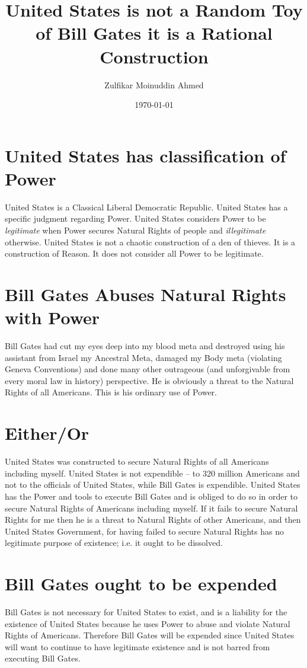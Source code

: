 \documentclass{amsart}
\title{United States is not a Random Toy of Bill Gates it is a Rational Construction}
\author{Zulfikar Moinuddin Ahmed}
\date{\today}
\begin{document}
\maketitle
\section{United States has classification of Power}

United States is a Classical Liberal Democratic Republic.  United States has a specific judgment regarding Power.  United States considers Power to be {\em legitimate} when Power secures Natural Rights of people and {\em illegitimate} otherwise.  United States is not a chaotic construction of a den of thieves.  It is a construction of Reason.  It does not consider all Power to be legitimate.

\section{Bill Gates Abuses Natural Rights with Power}
Bill Gates had cut my eyes deep into my blood meta and destroyed using his assistant from Israel my Ancestral Meta, damaged my Body meta (violating Geneva Conventions) and done many other outrageous (and unforgivable from every moral law in history) perspective.  He is obviously a threat to the Natural Rights of all Americans.  This is his ordinary use of Power.

\section{Either/Or}
United States was constructed to secure Natural Rights of all Americans including myself.  United States is not expendible -- to 320 million Americans and not to the officials of United States, while Bill Gates is expendible.  United States has the Power and tools to execute Bill Gates and is obliged to do so in order to secure Natural Rights of Americans including myself.  If it fails to secure Natural Rights for me then he is a threat to Natural Rights of other Americans, and then United States Government, for having failed to secure Natural Rights has no legitimate purpose of existence; i.e. it ought to be dissolved.  

\section{Bill Gates ought to be expended}

Bill Gates is not necessary for United States to exist, and is a liability for the existence of United States because he uses Power to abuse and violate Natural Rights of Americans.  Therefore Bill Gates will be expended since United States will want to continue to have legitimate existence and is not barred from executing Bill Gates. 
\end{document}
